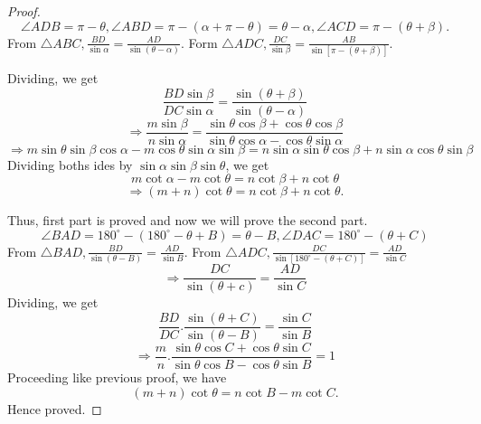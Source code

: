 \begin{proof}
  $$\angle ADB = \pi - \theta, \angle ABD = \pi - (\alpha + \pi - \theta) = \theta - \alpha, \angle ACD = \pi - (\theta + \beta).$$
  From $\triangle ABC, \frac{BD}{\sin\alpha} = \frac{AD}{\sin(\theta - \alpha)}$. Form $\triangle ADC, \frac{DC}{\sin\beta} =
  \frac{AB}{\sin[\pi - (\theta + \beta)]}$.

  \noindent Dividing, we get $$\frac{BD\sin\beta}{DC\sin\alpha} = \frac{\sin(\theta + \beta)}{\sin(\theta - \alpha)}$$
  $$\Rightarrow \frac{m\sin\beta}{n\sin\alpha} = \frac{\sin\theta\cos\beta + \cos\theta\cos\beta}{\sin\theta\cos\alpha -
    \cos\theta\sin\alpha}$$
  $$\Rightarrow m\sin\theta\sin\beta\cos\alpha - m\cos\theta\sin\alpha\sin\beta = n\sin\alpha\sin\theta\cos\beta +
  n\sin\alpha\cos\theta\sin\beta$$
  Dividing boths ides by $\sin\alpha\sin\beta\sin\theta$, we get
  $$m\cot\alpha - m\cot\theta = n\cot\beta + n\cot\theta$$
  $$\Rightarrow (m + n)\cot\theta = n\cot\beta + n\cot\theta.$$

  \noindent Thus, first part is proved and now we will prove the second part.
  $$\angle BAD = 180^\circ - (180^\circ - \theta + B) = \theta - B, \angle DAC = 180^\circ - (\theta + C)$$
  From $\triangle BAD, \frac{BD}{\sin(\theta - B)} = \frac{AD}{\sin B}$. From $\triangle ADC, \frac{DC}{\sin[180^\circ - (\theta +
      C)]} = \frac{AD}{\sin C}$
  $$\Rightarrow \frac{DC}{\sin(\theta + c)} = \frac{AD}{\sin C}$$
  Dividing, we get
  $$\frac{BD}{DC}.\frac{\sin(\theta + C)}{\sin(\theta - B)} = \frac{\sin C}{\sin B}$$
  $$\Rightarrow \frac{m}{n}.\frac{\sin\theta\cos C + \cos\theta\sin C}{\sin\theta\cos B - \cos\theta\sin B} = 1$$
  Proceeding like previous proof, we have
  $$(m + n)\cot\theta = n\cot B - m\cot C.$$
  Hence proved.
\end{proof}

